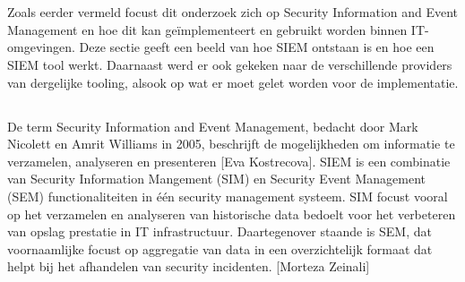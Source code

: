 \chapter{}
\label{ch:stand-van-zaken}

Zoals eerder vermeld focust dit onderzoek zich op Security Information and Event Management en hoe dit kan geïmplementeert en gebruikt worden binnen IT-omgevingen.
Deze sectie geeft een beeld van hoe SIEM ontstaan is en hoe een SIEM tool werkt. Daarnaast werd er ook gekeken naar de verschillende providers van dergelijke tooling, alsook op wat er moet gelet worden voor de implementatie.

\section{}

De term Security Information and Event Management, bedacht door Mark Nicolett en Amrit Williams in 2005, beschrijft de mogelijkheden om informatie te verzamelen, analyseren en presenteren [Eva Kostrecova]. SIEM is een combinatie van Security Information Mangement (SIM) en Security Event Management (SEM) functionaliteiten in één security management systeem. 
SIM focust vooral op het verzamelen en analyseren van historische data bedoelt voor het verbeteren van opslag prestatie in IT infrastructuur. Daartegenover staande is SEM, dat voornaamlijke focust op aggregatie van data in een overzichtelijk formaat dat helpt bij het afhandelen van security incidenten. [Morteza Zeinali]  
\section{}

\section{}

\section{}


